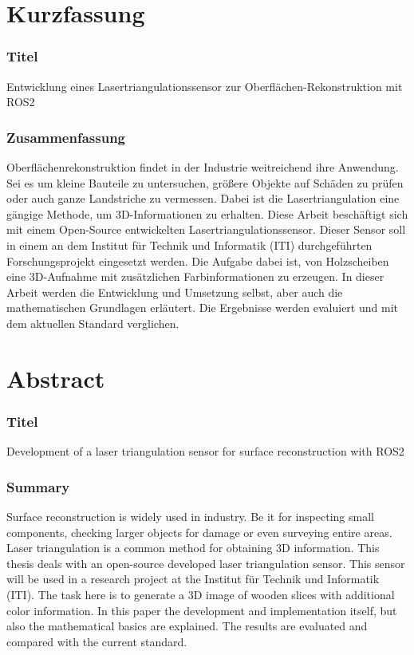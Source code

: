 \section*{Kurzfassung}
\subsubsection*{Titel}
Entwicklung eines Lasertriangulationssensor zur Oberflächen-Rekonstruktion mit ROS2
\vfill
\subsubsection*{Zusammenfassung}

Oberflächenrekonstruktion findet in der Industrie weitreichend ihre Anwendung. Sei es um kleine Bauteile zu untersuchen, größere Objekte auf Schäden zu prüfen oder auch ganze Landstriche zu vermessen. Dabei ist die Lasertriangulation eine gängige Methode, um 3D-Informationen zu erhalten. Diese Arbeit beschäftigt sich mit einem Open-Source entwickelten Lasertriangulationssensor. Dieser Sensor soll in einem an dem Institut für Technik und Informatik (ITI) durchgeführten Forschungsprojekt eingesetzt werden. Die Aufgabe dabei ist, von Holzscheiben eine 3D-Aufnahme mit zusätzlichen Farbinformationen zu erzeugen. In dieser Arbeit werden die Entwicklung und Umsetzung selbst, aber auch die mathematischen Grundlagen erläutert. Die Ergebnisse werden evaluiert und mit dem aktuellen Standard verglichen.

\section*{Abstract}
\subsubsection*{Titel}
Development of a laser triangulation sensor for surface reconstruction with ROS2

\vfill
\subsubsection*{Summary}

Surface reconstruction is widely used in industry. Be it for inspecting small components, checking larger objects for damage or even surveying entire areas. Laser triangulation is a common method for obtaining 3D information. This thesis deals with an open-source developed laser triangulation sensor. This sensor will be used in a research project at the Institut für Technik und Informatik (ITI). The task here is to generate a 3D image of wooden slices with additional color information. In this paper the development and implementation itself, but also the mathematical basics are explained. The results are evaluated and compared with the current standard.

